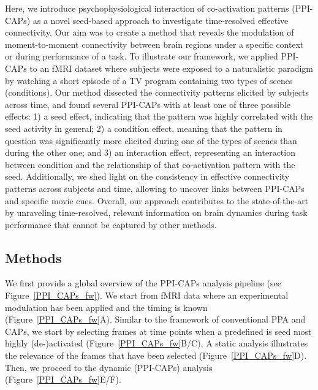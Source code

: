 Here, we introduce psychophysiological interaction of co-activation patterns (PPI-CAPs) as a novel seed-based approach to investigate time-resolved effective connectivity. Our aim was to create a method that reveals the modulation of moment-to-moment connectivity between brain regions under a specific context or during performance of a task. To illustrate our framework, we applied PPI-CAPs to an fMRI dataset where subjects were exposed to a naturalistic paradigm by watching a short episode of a TV program containing two types of scenes (conditions). Our method dissected the connectivity patterns elicited by subjects across time, and found several PPI-CAPs with at least one of three possible effects: 1) a seed effect, indicating that the pattern was highly correlated with the seed activity in general; 2) a condition effect, meaning that the pattern in question was significantly more elicited during one of the types of scenes than during the other one; and 3) an interaction effect, representing an interaction between condition and the relationship of that co-activation pattern with the seed. Additionally, we shed light on the consistency in effective connectivity patterns across subjects and time, allowing to uncover links between PPI-CAPs and specific movie cues. Overall, our approach contributes to the state-of-the-art by unraveling time-resolved, relevant information on brain dynamics during task performance that cannot be captured by other methods. 



\subsection{Methods}

We first provide a global overview of the PPI-CAPs analysis pipeline (see Figure~\ref{PPI_CAPs_fw}). We start from fMRI data where an experimental modulation has been applied and the timing is known (Figure~\ref{PPI_CAPs_fw}A). Similar to the framework of conventional PPA and CAPs, we start by selecting frames at time points when a predefined is seed most highly (de-)activated (Figure~\ref{PPI_CAPs_fw}B/C). A static analysis illustrates the relevance of the frames that have been selected (Figure~\ref{PPI_CAPs_fw}D). Then, we proceed to the dynamic (PPI-CAPs) analysis (Figure~\ref{PPI_CAPs_fw}E/F). 


